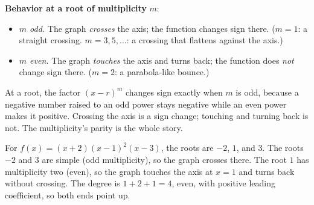 \documentclass[12pt]{book}
\begin{document}
\begin{keyidea}
\textbf{Behavior at a root of multiplicity} $m$:
\begin{itemize}\setlength{\itemsep}{2pt}
  \item \emph{$m$ odd.} The graph \emph{crosses} the axis; the function changes
        sign there. ($m=1$: a straight crossing. $m=3,5,\dots$: a crossing that
        flattens against the axis.)
  \item \emph{$m$ even.} The graph \emph{touches} the axis and turns back; the
        function does \emph{not} change sign there. ($m=2$: a parabola-like bounce.)
\end{itemize}
\end{keyidea}

\begin{visual}
At a root, the factor $(x-r)^m$ changes sign exactly when $m$ is odd, because a
negative number raised to an odd power stays negative while an even power makes it
positive. Crossing the axis is a sign change; touching and turning back is not. The
multiplicity's parity is the whole story.
\end{visual}

\begin{center}
\end{center}

\begin{example}
For $f(x)=(x+2)(x-1)^2(x-3)$, the roots are $-2$, $1$, and $3$. The roots $-2$ and
$3$ are simple (odd multiplicity), so the graph crosses there. The root $1$ has
multiplicity two (even), so the graph touches the axis at $x=1$ and turns back
without crossing. The degree is $1+2+1=4$, even, with positive leading coefficient,
so both ends point up.
\end{example}
\end{document}
